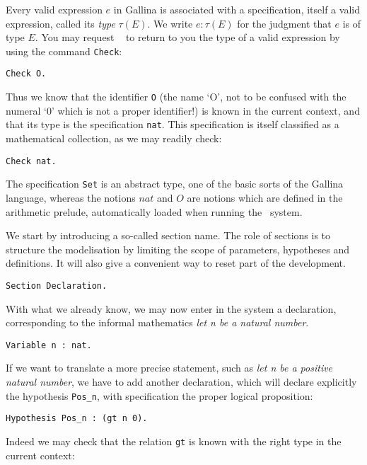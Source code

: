 \documentclass{book}
\begin{document}
Every valid expression $e$ in Gallina is associated with a specification,
itself a valid expression, called its {\sl type} $\tau(E)$. We write
$e:\tau(E)$ for the judgment that $e$ is of type $E$. 
You may request \Coq~ to return to you the type of a valid expression by using
the command \verb:Check::

\begin{lstlisting}
Check O.
\end{lstlisting}

Thus we know that the identifier \verb:O: (the name `O', not to be
confused with the numeral `0' which is not a proper identifier!) is
known in the current context, and that its type is the specification 
\verb:nat:. This specification is itself classified as a mathematical
collection, as we may readily check:

\begin{lstlisting}
Check nat.
\end{lstlisting}

The specification \verb:Set: is an abstract type, one of the basic
sorts of the Gallina language, whereas the notions $nat$ and $O$ are
notions which are defined in the arithmetic prelude,
automatically loaded when running the \Coq\ system.

We start by introducing a so-called section name. The role of sections
is to structure the modelisation by limiting the scope of parameters,
hypotheses and definitions. It will also give a convenient way to
reset part of the development.

\begin{lstlisting}
Section Declaration.
\end{lstlisting}
With what we already know, we may now enter in the system a declaration,
corresponding to the informal mathematics {\sl let n be a natural
  number}. 

\begin{lstlisting}
Variable n : nat.
\end{lstlisting}

If we want to translate a more precise statement, such as
{\sl let n be a positive natural number},
we have to add another declaration, which will declare explicitly the
hypothesis \verb:Pos_n:, with specification the proper logical
proposition:
\begin{lstlisting}
Hypothesis Pos_n : (gt n 0).
\end{lstlisting}

Indeed we may check that the relation \verb:gt: is known with the right type
in the current context:
\end{document}
